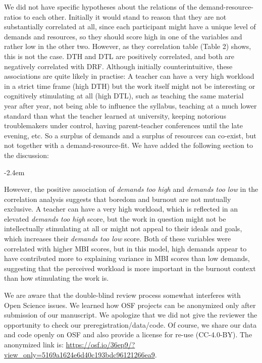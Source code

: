 \documentclass[draft]{article}
\renewenvironment{quote}{\begin{fquote}\advance\leftmargini -2.4em\begin{oldquote}}{\end{oldquote}\end{fquote}}
\newenvironment{fquote}
  {\def\FrameCommand{
	\fboxsep=0.6em %
	\fcolorbox{black}{white}}%
    \MakeFramed {\advance\hsize-2\width \FrameRestore}
    \begin{minipage}{\linewidth}
  }
  {\end{minipage}\endMakeFramed}
\begin{document}
We did not have specific hypotheses about the relations of the demand-resource-ratios to each other.
Initially it would stand to reason that they are not substantially correlated at all, since each participant might have a unique level of demands and resources, so they should score high in one of the variables and rather low in the other two.
However, as they correlation table (Table 2) shows, this is not the case.
DTH and DTL are positively correlated, and both are negatively correlated with DRF.
Although initially counterintuitive, these associations are quite likely in practise: A teacher can have a very high workload in a strict time frame (high DTH) but the work itself might not be interesting or cognitively stimulating at all (high DTL), such as teaching the same material year after year, not being able to influence the syllabus, teaching at a much lower standard than what the teacher learned at university, keeping notorious troublemakers under control, having parent-teacher conferences until the late evening, etc.
So a surplus of demands and a surplus of resources can co-exist, but not together with a demand-resource-fit.
We have added the following section to the discussion:

\begin{quote}
However, the positive association of \emph{demands too high} and \emph{demands too low} in the correlation analysis suggests that boredom and burnout are not mutually exclusive.
A teacher can have a very high workload, which is reflected in an elevated \emph{demands too high} score, but the work in question might not be intellectually stimulating at all or might not appeal to their ideals and goals, which increases their \emph{demands too low} score.
Both of these variables were correlated with higher MBI scores, but in this model, high demands appear to have contributed more to explaining variance in MBI scores than low demands, suggesting that the perceived workload is more important in the burnout context than how stimulating the work is.
\end{quote}


We are aware that the double-blind review process somewhat interferes with Open Science issues.
We learned how OSF projects can be anonymized only after submission of our manuscript.
We apologize that we did not give the reviewer the opportunity to check our preregistration/data/code.
Of course, we share our data and code openly on OSF and also provide a license for re-use (CC-4.0-BY).
The anonymized link is: \url{https://osf.io/36ep9/?view_only=5169a1624e6d40c193bdc96121266ea9}.
\end{document}

